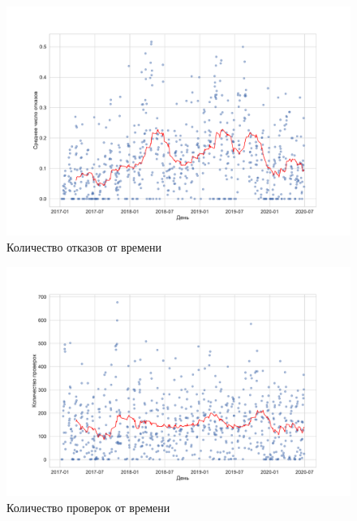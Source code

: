 \begin{landscape}
	\begin{figure}[h]
		\centering
		\includegraphics[height=0.9\textwidth, clip, trim={0 1cm 0 3cm}]{pics/breaks_num}
		\caption{Количество отказов от времени}
		\label{breaks_num}
	\end{figure}
\end{landscape}
\begin{landscape}
	\begin{figure}[h]
		\centering
		\includegraphics[height=0.9\textwidth, clip, trim={0 1cm 0 3cm}]{pics/check_num}
		\caption{Количество проверок от времени}
		\label{check_num}
	\end{figure}
\end{landscape}


